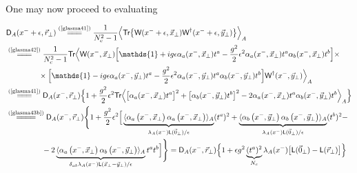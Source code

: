 \begin{note}
\begin{subequations}
\begin{align}
    \end{align}
    \end{subequations}
    \vspace*{-0.5\baselineskip}
    One may now proceed to evaluating 
    \begin{fullwidth}
    \begin{align*}
        &\textsf{D}_A(x^-+\epsilon,\vec{r}_\perp)\stackrel{(\text{\cref{glasma41}})}{=\joinrel=\joinrel=}\frac{1}{N_c^2-1} \Big\langle \textsf{Tr}\big\{\textsf{W}(x^-+\epsilon,\vec{x}_\perp) \textsf{W}^{\dagger}(x^-+\epsilon,\vec{y}_\perp)\big\}\Big\rangle_A\\
        &\stackrel{(\text{\cref{glasma42}})}{=\joinrel=\joinrel=}\frac{1}{N_c^2-1}\textsf{Tr}\Big\langle\textsf{W}(x^-,\vec{x}_\perp)\Big[\mathds{1}+ig\epsilon\alpha_a(x^-,\vec{x}_\perp)t^a-\frac{g^2}{2}\epsilon^2\alpha_a(x^-,\vec{x}_\perp)t^a\alpha_b(x^-,\vec{x}_\perp)t^b\Big]\times\\
        &\phantom{\stackrel{(\text{\cref{glasma42}})}{=\joinrel=\joinrel=}}\times\Big[\mathds{1}-ig\epsilon\alpha_a(x^-,\vec{y}_\perp)t^a-\frac{g^2}{2}\epsilon^2\alpha_a(x^-,\vec{y}_\perp)t^a\alpha_b(x^-,\vec{y}_\perp)t^b\Big]\textsf{W}^\dagger(x^-,\vec{y}_\perp)\Big\rangle_A\\
        &\stackrel{(\text{\cref{glasma41}})}{=\joinrel=\joinrel=}\textsf{D}_A(x^-,\vec{r}_\perp)\Big\{1+\frac{g^2}{2}\epsilon^2\textsf{Tr}\Big\langle\big[\alpha_a(x^-,\vec{x}_\perp)t^a\big]^2+\big[\alpha_b(x^-,\vec{y}_\perp)t^b\big]^2-2\alpha_a(x^-,\vec{x}_\perp)t^a\alpha_b(x^-,\vec{y}_\perp)t^b\Big\rangle_A\Big\}\\
        &\stackrel{(\text{\cref{glasma43b}})}{=\joinrel=\joinrel=\joinrel=}\textsf{D}_A(x^-,\vec{r}_\perp)\Bigg\{1+\frac{g^2}{2}\epsilon^2\Big[\underbrace{\langle\alpha_a\left(x^-,\vec{x}_\perp\right)\alpha_a\left(x^-,\vec{x}_\perp\right)\rangle_A}_{\lambda_A(x^-)\textsf{L}(\vec{0}_\perp)/\epsilon}(t^a)^2+\underbrace{\langle\alpha_b\left(x^-,\vec{y}_\perp\right)\alpha_b\left(x^-,\vec{y}_\perp\right)\rangle_A}_{\lambda_A(x^-)\textsf{L}(\vec{0}_\perp)/\epsilon}(t^b)^2-\\
        &\phantom{\stackrel{(\text{\cref{glasma43b}})}{=\joinrel=\joinrel=\joinrel=}}-2\underbrace{\langle\alpha_a\left(x^-,\vec{x}_\perp\right)\alpha_b\left(x^-,\vec{y}_\perp\right)\rangle_A}_{\delta_{ab}\lambda_A(x^-)\textsf{L}(\vec{x}_\perp-\vec{y}_\perp)/\epsilon}t^at^b\Big]\Bigg\}=\textsf{D}_A(x^-,\vec{r}_\perp)\Big\{1+\epsilon g^2\underbrace{(t^a)^2}_{N_c}\lambda_A(x^-)\big[\textsf{L}(\vec{0}_\perp)-\textsf{L}(\vec{r}_\perp)\big]\Big\}
    \end{align*}
    \end{fullwidth}
    

\end{note}
